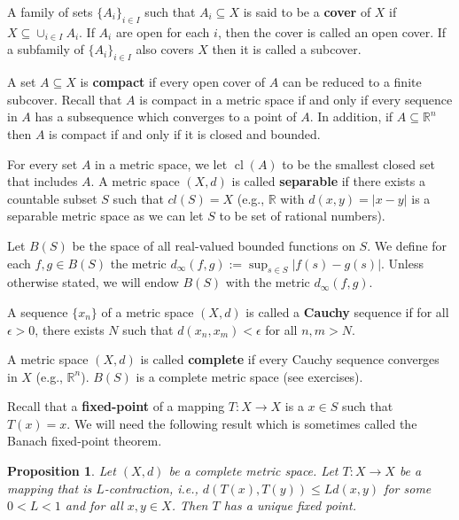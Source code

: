 \documentclass[letter,11pt]{article}
\newtheorem{proposition}{Proposition}[section]
\begin{document}
A family of sets $\{A_{i} \}_{i \in I}$ such that $A_{i} \subseteq X$ is said to be a \textbf{cover} of $X$ if $X \subseteq \cup _{i \in I} A_{i} $. If $A_{i}$ are open for each $i$, then the cover is called an open cover. If a subfamily of $\{A_{i} \}_{i \in I}$ also covers $X$ then it is called a subcover. 

A set $A \subseteq X$ is \textbf{compact} if every open cover of $A$ can be reduced to a finite subcover.  
Recall that $A$ is compact in a metric space if and only if every sequence in $A$ has a subsequence which converges to a point of $A$. 
In addition, if $A \subseteq \mathbb{R}^{n}$ then $A$ is compact if and only if it is closed and bounded. 



For every set $A$ in a metric space, we let $\operatorname{cl} (A)$ to be the smallest closed set that includes $A$. 
A metric space $(X,d)$ is called \textbf{separable} if there exists a countable subset $S$ such that $cl(S) = X$ (e.g., $\mathbb{R}$ with $d(x,y) = 
|x-y| $ is a separable metric space as we can let $S$ to be set of rational numbers). 

Let $B(S)$ be the space of all real-valued bounded functions on $S$. We define for each $f,g \in B(S)$ the metric $d_{\infty} (f,g):= \sup _{s \in S} |f(s) - g(s)|$. 
Unless otherwise stated, we will endow $B(S)$ with the metric $d_{\infty} (f,g)$. 

A sequence $\{x_{n}\}$ of a metric space $(X,d)$ is called a \textbf{Cauchy} sequence if for all $\epsilon >0$, there exists $N$ such that $d(x_{n},x_{m}) < \epsilon$ for all $n,m > N$. 

A metric space $(X,d)$ is called \textbf{complete} if every Cauchy sequence converges in $X$ (e.g., $\mathbb{R}^{n}$). 
 $B(S)$ is a complete metric space (see exercises). 







Recall that a \textbf{fixed-point} of a mapping $T : X \rightarrow X$ is a $x \in S$ such that $T(x) = x$.  We will need the following result which is sometimes called the Banach fixed-point theorem. 

\begin{proposition}\label{prop:Banach}
Let $(X,d)$ be a complete metric space. Let $T : X \rightarrow X$ be a mapping that is $L$-contraction, i.e., $d(T(x),T(y)) \leq L d(x,y)$ for some $0<L<1$ and for all $x,y \in X$. Then $T$ has a unique fixed point. 

\end{proposition}
\end{document}
